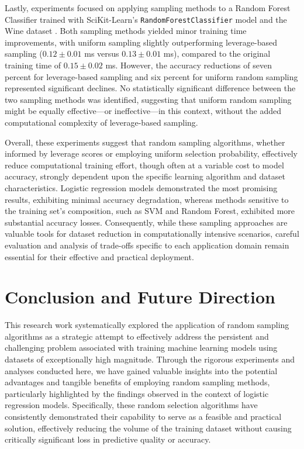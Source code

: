 \documentclass{article}
\theoremstyle{plain}
\theoremstyle{definition}
\theoremstyle{remark}
\begin{document}
Lastly, experiments focused on applying sampling methods to a Random Forest Classifier trained with SciKit-Learn's \texttt{RandomForestClassifier} model and the Wine dataset \cite{wine}. Both sampling methods yielded minor training time improvements, with uniform sampling slightly outperforming leverage-based sampling ($0.12 \pm 0.01$ ms versus $0.13 \pm 0.01$ ms), compared to the original training time of $0.15 \pm 0.02$ ms. However, the accuracy reductions of seven percent for leverage-based sampling and six percent for uniform random sampling represented significant declines. No statistically significant difference between the two sampling methods was identified, suggesting that uniform random sampling might be equally effective—or ineffective—in this context, without the added computational complexity of leverage-based sampling.

Overall, these experiments suggest that random sampling algorithms, whether informed by leverage scores or employing uniform selection probability, effectively reduce computational training effort, though often at a variable cost to model accuracy, strongly dependent upon the specific learning algorithm and dataset characteristics. Logistic regression models demonstrated the most promising results, exhibiting minimal accuracy degradation, whereas methods sensitive to the training set's composition, such as SVM and Random Forest, exhibited more substantial accuracy losses. Consequently, while these sampling approaches are valuable tools for dataset reduction in computationally intensive scenarios, careful evaluation and analysis of trade-offs specific to each application domain remain essential for their effective and practical deployment.


\section{Conclusion and Future Direction}

This research work systematically explored the application of random sampling algorithms as a strategic attempt to effectively address the persistent and challenging problem associated with training machine learning models using datasets of exceptionally high magnitude. Through the rigorous experiments and analyses conducted here, we have gained valuable insights into the potential advantages and tangible benefits of employing random sampling methods, particularly highlighted by the findings observed in the context of logistic regression models. Specifically, these random selection algorithms have consistently demonstrated their capability to serve as a feasible and practical solution, effectively reducing the volume of the training dataset without causing critically significant loss in predictive quality or accuracy. 
\end{document}

